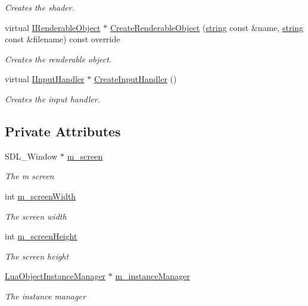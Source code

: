 \begin{DoxyCompactItemize}
\begin{DoxyCompactList}\small\item\em Creates the shader. \end{DoxyCompactList}\item 
virtual \hyperlink{class_i_renderable_object}{I\+Renderable\+Object} $\ast$ \hyperlink{class_g_l_engine_a1a85f49c07fdba2e557ed8ad658532d7}{Create\+Renderable\+Object} (\hyperlink{_types_8h_ad453f9f71ce1f9153fb748d6bb25e454}{string} const \&name, \hyperlink{_types_8h_ad453f9f71ce1f9153fb748d6bb25e454}{string} const \&filename) const  override
\begin{DoxyCompactList}\small\item\em Creates the renderable object. \end{DoxyCompactList}\item 
virtual \hyperlink{class_i_input_handler}{I\+Input\+Handler} $\ast$ \hyperlink{class_g_l_engine_af6573bf7df998f6fdea8bcf593334d67}{Create\+Input\+Handler} ()
\begin{DoxyCompactList}\small\item\em Creates the input handler. \end{DoxyCompactList}\end{DoxyCompactItemize}
\subsection*{Private Attributes}
\begin{DoxyCompactItemize}
\item 
S\+D\+L\+\_\+\+Window $\ast$ \hyperlink{class_g_l_engine_ac7bf2bf114dfb36884012993fd711b3f}{m\+\_\+screen}
\begin{DoxyCompactList}\small\item\em The m screen \end{DoxyCompactList}\item 
int \hyperlink{class_g_l_engine_a9d34663f2b656c3c9e5af29e5e18a6e5}{m\+\_\+screen\+Width}
\begin{DoxyCompactList}\small\item\em The screen width \end{DoxyCompactList}\item 
int \hyperlink{class_g_l_engine_a18ac40a2dc119a5e2b2bc08e588016fe}{m\+\_\+screen\+Height}
\begin{DoxyCompactList}\small\item\em The screen height \end{DoxyCompactList}\item 
\hyperlink{class_lua_object_instance_manager}{Lua\+Object\+Instance\+Manager} $\ast$ \hyperlink{class_g_l_engine_a2c0f71644e63fe4e76b809207d7d7d0a}{m\+\_\+instance\+Manager}
\begin{DoxyCompactList}\small\item\em The instance manager \end{DoxyCompactList}\end{DoxyCompactItemize}


